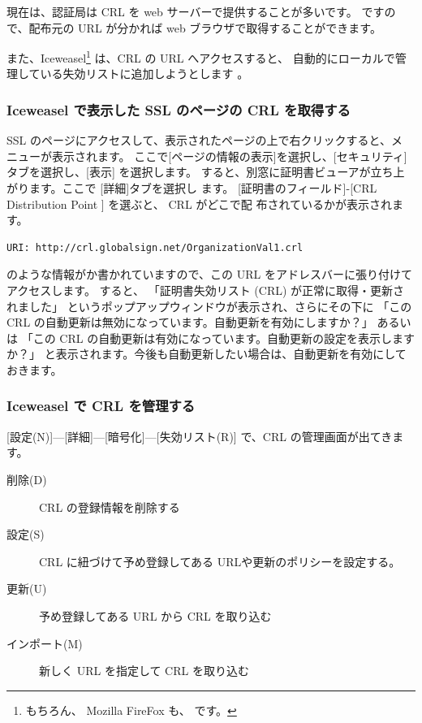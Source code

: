 \documentclass[mingoth,a4paper]{jsarticle}
\begin{document}
現在は、認証局は CRL を web サーバーで提供することが多いです。
ですので、配布元の URL が分かれば web ブラウザで取得することができます。

また、Iceweasel\footnote{もちろん、 Mozilla FireFox も、
です。} は、CRL の URL へアクセスすると、
自動的にローカルで管理している失効リストに追加しようとします%
。

\subsubsection{Iceweasel で表示した SSL のページの CRL を取得する}

SSL のページにアクセスして、表示されたページの上で右クリックすると、メ
ニューが表示されます。
ここで[ページの情報の表示]を選択し、[セキュリティ] タブを選択し、[表示]
を選択します。
すると、別窓に証明書ビューアが立ち上がります。ここで [詳細]タブを選択し
ます。
[証明書のフィールド]-[CRL Distribution Point ] を選ぶと、 CRL がどこで配
布されているかが表示されます。

\begin{verbatim}
URI: http://crl.globalsign.net/OrganizationVal1.crl
\end{verbatim}
のような情報がか書かれていますので、この URL をアドレスバーに張り付けて
アクセスします。
すると、
「証明書失効リスト (CRL) が正常に取得・更新されました」
というポップアップウィンドウが表示され、さらにその下に
「この CRL の自動更新は無効になっています。自動更新を有効にしますか？」
あるいは
「この CRL の自動更新は有効になっています。自動更新の設定を表示しますか？」
と表示されます。今後も自動更新したい場合は、自動更新を有効にしておきます。

\subsubsection{Iceweasel で CRL を管理する}

[設定(N)]---[詳細]---[暗号化]---[失効リスト(R)] で、CRL の管理画面が出てきます。

\begin{description}
\item[削除(D)] CRL の登録情報を削除する
\item[設定(S)] CRL に紐づけて予め登録してある URLや更新のポリシーを設定する。
\item[更新(U)] 予め登録してある URL から CRL を取り込む
\item[インポート(M)] 新しく URL を指定して CRL を取り込む
\end{description}
\end{document}
